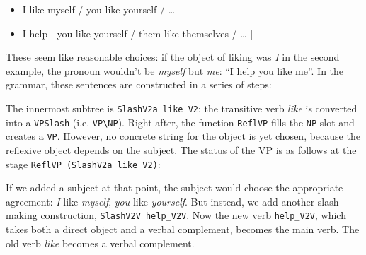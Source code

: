 \begin{itemize}
\itemsep1pt\parskip0pt
\item
  I like myself / you like yourself / \ldots{}
\item
  I help [ you like yourself / them like themselves / \ldots{} ]
\end{itemize}

These seem like reasonable choices: if the object of liking was \emph{I}
in the second example, the pronoun wouldn't be \emph{myself} but \emph{me}: ``I
help you like me''.
In the \gf{} grammar, these sentences are constructed in a series of steps:

\begin{EmptyItem}
\begin{Highlighting}[]
 \NormalTok{(} 
       \NormalTok{(}
           \NormalTok{(} 
               \NormalTok{(}
                 \NormalTok{(} 
               \NormalTok{)}
           \NormalTok{)}
           \NormalTok{(} 
       \NormalTok{)}
\end{Highlighting}
\end{EmptyItem}

The innermost subtree is \texttt{SlashV2a like\_V2}: the transitive verb
\emph{like} is converted into a \texttt{VPSlash} (i.e.
\texttt{VP\textbackslash{}NP}). Right after, the function
\texttt{ReflVP} fills the \texttt{NP} slot and creates a \texttt{VP}.
However, no concrete string for the object is yet chosen, because the
reflexive object depends on the subject. The status of the VP is as
follows at the stage \texttt{ReflVP (SlashV2a like\_V2)}:

\begin{EmptyItem}
\begin{Highlighting}[]
    \FunctionTok{=}  \NormalTok{;}
\FunctionTok{=}  \OtherTok{=>}  \NormalTok{; } \OtherTok{=>}  
\FunctionTok{=} \NormalTok{[] ;}
\end{Highlighting}
\end{EmptyItem}

If we added a subject at that point, the subject would choose the
appropriate agreement: \emph{I} like \emph{myself}, \emph{you} like
\emph{yourself}. But instead, we add another slash-making construction,
\texttt{SlashV2V help\_V2V}. Now the new verb \texttt{help\_V2V}, which
takes both a direct object and a verbal complement, becomes the main
verb. The old verb \emph{like} becomes a verbal complement.

